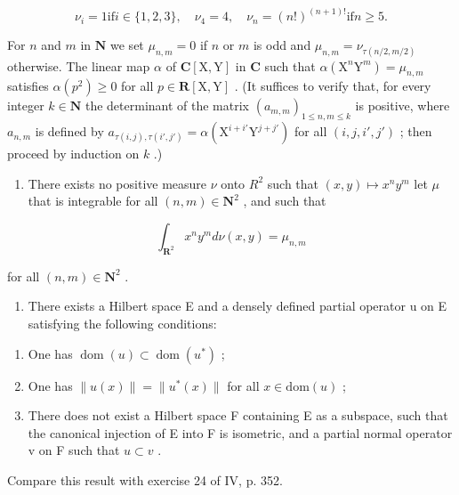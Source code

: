 \[
\nu_ {i} = 1 \text {if} i \in \{1, 2, 3 \}, \quad \nu_ {4} = 4, \quad \nu_ {n} = (n!) ^ {(n + 1)!} \text {if} n \geqslant 5.
\]

For \(n\) and \(m\) in \(\mathbf{N}\) we set \(\mu_{n,m} = 0\) if \(n\) or \(m\) is odd and \(\mu_{n,m} = \nu_{\tau(n/2,m/2)}\) otherwise. The linear map \(\alpha\) of \(\mathbf{C}[\mathrm{X},\mathrm{Y}]\) in \(\mathbf{C}\) such that \(\alpha(\mathrm{X}^n\mathrm{Y}^m) = \mu_{n,m}\) satisfies \(\alpha(p^2) \geqslant 0\) for all \(p \in \mathbf{R}[\mathrm{X},\mathrm{Y}]\) . (It suffices to verify that, for every integer \(k \in \mathbf{N}\) the determinant of the matrix \((a_{m,m})_{1 \leqslant n,m \leqslant k}\) is positive, where \(a_{n,m}\) is defined by \(a_{\tau(i,j),\tau(i',j')} = \alpha(\mathrm{X}^{i+i'}\mathrm{Y}^{j+j'})\) for all \((i,j,i',j')\) ; then proceed by induction on \(k\) .)

\begin{enumerate}
\def\labelenumi{\alph{enumi})}
\setcounter{enumi}{4}
\tightlist
\item
  There exists no positive measure \(\nu\) onto \(R^{2}\) such that \((x,y)\mapsto x^{n}y^{m}\) let \(\mu\) that is integrable for all \((n,m)\in\mathbf{N}^{2}\) , and such that
\end{enumerate}

\[
\int_ {\mathbf {R} ^ {2}} x ^ {n} y ^ {m} d \nu (x, y) = \mu_ {n, m}
\]

for all \((n,m)\in\mathbf{N}^{2}\) .

\begin{enumerate}
\def\labelenumi{\alph{enumi})}
\setcounter{enumi}{5}
\tightlist
\item
  There exists a Hilbert space E and a densely defined partial operator u on E satisfying the following conditions:
\end{enumerate}

\begin{enumerate}
\def\labelenumi{(\roman{enumi})}
\item
  One has \(\operatorname{dom}(u) \subset \operatorname{dom}(u^*)\) ;
\item
  One has \(\|u(x)\|=\|u^{*}(x)\|\) for all \(x\in\mathrm{dom}(u)\) ;
\item
  There does not exist a Hilbert space F containing E as a subspace, such that the canonical injection of E into F is isometric, and a partial normal operator v on F such that \(u \subset v\) .
\end{enumerate}

Compare this result with exercise 24 of IV, p. 352.

